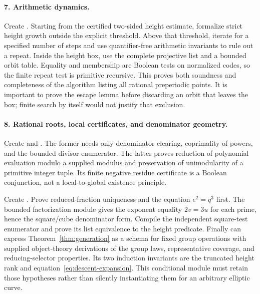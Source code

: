 \paragraph{7. Arithmetic dynamics.}
Create .  Starting from the certified two-sided
height estimate, formalize strict height growth outside the explicit
threshold.  Above that threshold, iterate for a specified number of
steps and use quantifier-free arithmetic invariants to rule out a repeat.
Inside the height box, use the complete projective list and a bounded
orbit table.  Equality and membership are Boolean tests on normalized
codes, so the finite repeat test is primitive recursive.  This proves
both soundness and completeness of the algorithm listing all rational
preperiodic points.  It is important to prove the escape lemma before
discarding an orbit that leaves the box; finite search by itself would
not justify that exclusion.

\paragraph{8. Rational roots, local certificates, and denominator geometry.}
Create  and
.  The former needs only denominator
clearing, coprimality of powers, and the bounded divisor enumerator.
The latter proves reduction of polynomial evaluation modulo a supplied
modulus and preservation of unimodularity of a primitive integer tuple.
Its finite negative residue certificate is a Boolean conjunction, not a
local-to-global existence principle.

Create .  Prove reduced-fraction
uniqueness and the equation $e^2=q^3$ first.  The bounded factorization
module gives the exponent equality $2v=3u$ for each prime, hence the
square/cube denominator form.  Compile the independent square-test
enumerator and prove its list equivalence to the height predicate.
Finally  can express
Theorem~\ref{thm:generation} as a schema for fixed group operations with
supplied object-theory derivations of the group laws, representative
coverage, and reducing-selector properties.  Its two induction invariants
are the truncated height rank and equation~\eqref{eq:descent-expansion}.
This conditional module must retain those hypotheses rather than silently
instantiating them for an arbitrary elliptic curve.

